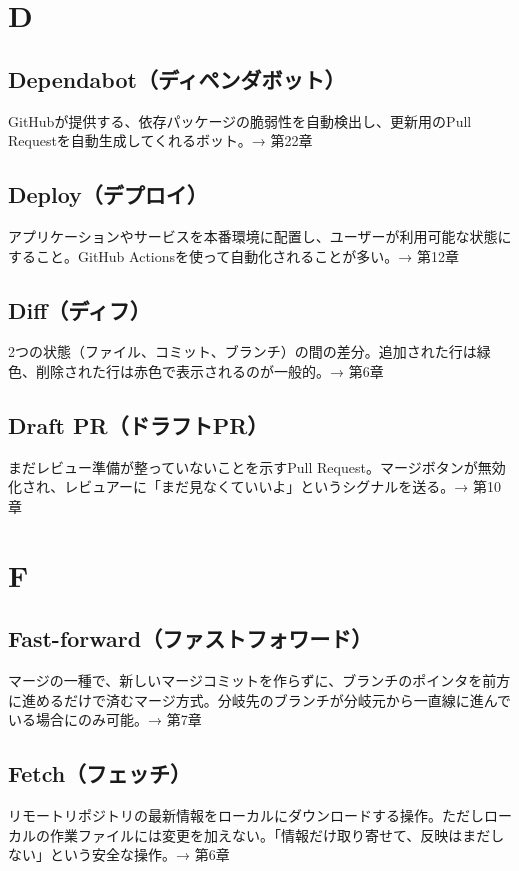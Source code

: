 \section*{D}

\subsection*{Dependabot（ディペンダボット）}
GitHubが提供する、依存パッケージの脆弱性を自動検出し、更新用のPull Requestを自動生成してくれるボット。→ 第22章

\subsection*{Deploy（デプロイ）}
アプリケーションやサービスを本番環境に配置し、ユーザーが利用可能な状態にすること。GitHub Actionsを使って自動化されることが多い。→ 第12章

\subsection*{Diff（ディフ）}
2つの状態（ファイル、コミット、ブランチ）の間の差分。追加された行は緑色、削除された行は赤色で表示されるのが一般的。→ 第6章

\subsection*{Draft PR（ドラフトPR）}
まだレビュー準備が整っていないことを示すPull Request。マージボタンが無効化され、レビュアーに「まだ見なくていいよ」というシグナルを送る。→ 第10章

\section*{F}

\subsection*{Fast-forward（ファストフォワード）}
マージの一種で、新しいマージコミットを作らずに、ブランチのポインタを前方に進めるだけで済むマージ方式。分岐先のブランチが分岐元から一直線に進んでいる場合にのみ可能。→ 第7章

\subsection*{Fetch（フェッチ）}
リモートリポジトリの最新情報をローカルにダウンロードする操作。ただしローカルの作業ファイルには変更を加えない。「情報だけ取り寄せて、反映はまだしない」という安全な操作。→ 第6章

